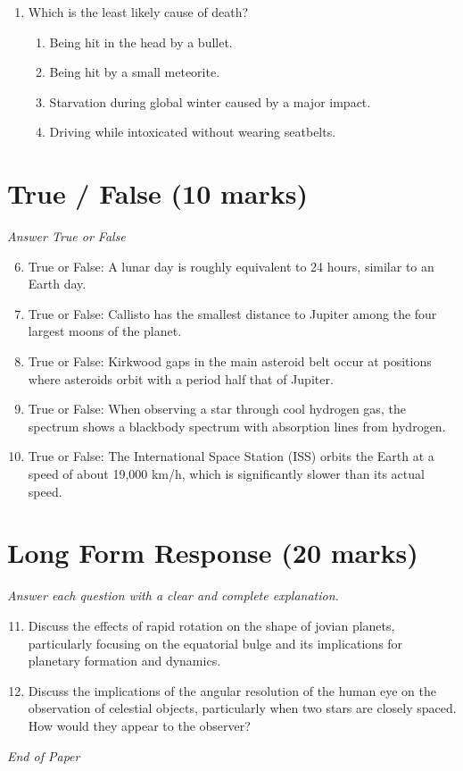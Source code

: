 \documentclass[12pt]{article}
\begin{document}
\begin{enumerate}[label=\arabic*.]
\begin{enumerate}[label=(\alph*)]
    \item plankton that use sunlight as an energy source through photosynthesis
\end{enumerate}
\item Which is the least likely cause of death?
\begin{enumerate}[label=(\alph*)]
    \item Being hit in the head by a bullet.
    \item Being hit by a small meteorite.
    \item Starvation during global winter caused by a major impact.
    \item Driving while intoxicated without wearing seatbelts.
\end{enumerate}
\end{enumerate}

\section*{True / False (10 marks)}
\textit{Answer True or False}
\begin{enumerate}[label=\arabic*.]
\setcounter{enumi}{5}
\item True or False: A lunar day is roughly equivalent to 24 hours, similar to an Earth day.
\item True or False: Callisto has the smallest distance to Jupiter among the four largest moons of the planet.
\item True or False: Kirkwood gaps in the main asteroid belt occur at positions where asteroids orbit with a period half that of Jupiter.
\item True or False: When observing a star through cool hydrogen gas, the spectrum shows a blackbody spectrum with absorption lines from hydrogen.
\item True or False: The International Space Station (ISS) orbits the Earth at a speed of about 19,000 km/h, which is significantly slower than its actual speed.
\end{enumerate}

\section*{Long Form Response (20 marks)}
\textit{Answer each question with a clear and complete explanation.}
\begin{enumerate}[label=\arabic*.]
\setcounter{enumi}{10}
\item Discuss the effects of rapid rotation on the shape of jovian planets, particularly focusing on the equatorial bulge and its implications for planetary formation and dynamics.
\item Discuss the implications of the angular resolution of the human eye on the observation of celestial objects, particularly when two stars are closely spaced. How would they appear to the observer?
\end{enumerate}

\vfill
\noindent\textit{End of Paper}
\end{document}
